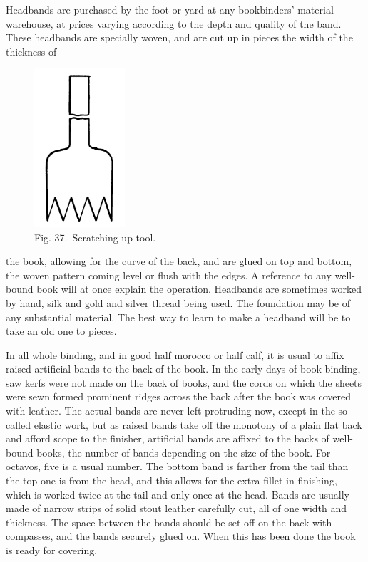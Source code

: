 \documentclass[twoside]{book}
\begin{document}
Headbands are purchased by the foot or yard at
any bookbinders' material warehouse, at prices
varying according to the depth and quality of the
band. These headbands are specially woven, and
are cut up in pieces the width of the thickness of
	\begin{figure}[h]
		\centering
		\includegraphics[width=0.3\textwidth]{Figures/_037.png}
		\caption*{Fig. 37.--Scratching-up tool.}
	\end{figure}
the book, allowing for the curve of the back, and
are glued on top and bottom, the woven pattern
coming level or flush with the edges. A reference
to any well-bound book will at once explain the
operation. Headbands are sometimes worked by
hand, silk and gold and silver thread being used.
The foundation may be of any substantial material.
The best way to learn to make a headband will be
to take an old one to pieces.

In all whole binding, and in good half morocco
or half calf, it is usual to affix raised artificial bands
to the back of the book. In the early days of
\pagebreak
book-binding, saw kerfs were not made on the back of
books, and the cords on which the sheets were sewn
formed prominent ridges across the back after the
book was covered with leather. The actual bands
are never left protruding now, except in the so-
called elastic work, but as raised bands take off the
monotony of a plain flat back and afford scope to
the finisher, artificial bands are affixed to the backs
of well-bound books, the number of bands depending
on the size of the book. For octavos, five is
a usual number. The bottom band is farther from
the tail than the top one is from the head, and this
allows for the extra fillet in finishing, which is
worked twice at the tail and only once at the head.
Bands are usually made of narrow strips of solid
stout leather carefully cut, all of one width and
thickness. The space between the bands should be
set off on the back with compasses, and the bands
securely glued on. When this has been done the
book is ready for covering.
\end{document}
